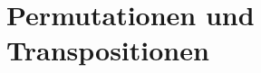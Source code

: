 %
%
%
\section{Permutationen und Transpositionen
\label{buch:section:permutationen-und-transpositionen}}

